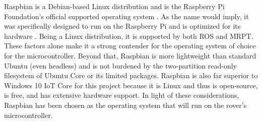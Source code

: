 \documentclass[onecolumn, draftclsnofoot,10pt, compsoc]{IEEEtran}
\begin{document}
Raspbian is a Debian-based Linux distribution and is the Raspberry Pi Foundation's official supported operating system \cite{Raspbian}. As the name would imply, it was specifically designed to run on the Raspberry Pi and is optimized for its hardware \cite{Raspbian2}. Being a Linux distribution, it is supported by both ROS and MRPT. These factors alone make it a strong contender for the operating system of choice for the microcontroller. Beyond that, Raspbian is more lightweight than standard Ubuntu (even headless) and is not burdened by the two-partition read-only filesystem of Ubuntu Core or its limited packages. Raspbian is also far superior to Windows 10 IoT Core for this project because it is Linux and thus is open-source, is free, and has extensive hardware support. In light of these considerations, Raspbian has been chosen as the operating system that will run on the rover's microcontroller.
\end{document}
